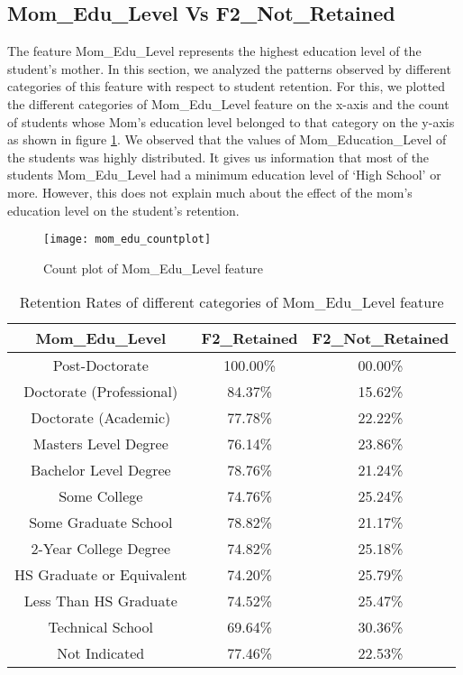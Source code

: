 \documentclass[11pt,openright]{report}
\begin{document}
\subsection {Mom\_Edu\_Level	 Vs F2\_Not\_Retained}
The feature Mom\_Edu\_Level represents the highest education level of the student's mother. In this section, we analyzed the patterns observed by different categories of this feature with respect to student retention. For this, we plotted the different categories of Mom\_Edu\_Level feature on the x-axis and the count of students whose Mom's education level belonged to that category on the y-axis as shown in figure \ref{fig:mom_edu_F2NotRetained_plot}. We observed that the values of Mom\_Education\_Level of the students was highly distributed. It gives us information that most of the students Mom\_Edu\_Level had a minimum education level of `High School' or more. However, this does not explain much about the effect of the mom's education level on the student's retention.

\begin{figure}[!ht]
	\centering
	\texttt{[image: mom\_edu\_countplot]}
	\caption{Count plot of Mom\_Edu\_Level feature}
	\label{fig:mom_edu_F2NotRetained_plot}
\end{figure}

\begin{table}[!t]
	\renewcommand{\arraystretch}{1.3}
	\caption{Retention Rates of different categories of Mom\_Edu\_Level feature}
	\label{table:mom_edu_retentions}
	\centering
	\begin{tabular}{|c|c|c|}
		\hline
		\bfseries Mom\_Edu\_Level & \bfseries F2\_Retained & \bfseries F2\_Not\_Retained\\
		\hline
		Post-Doctorate  & 100.00\%  & 00.00\% \\ \hline
		Doctorate (Professional) & 84.37\% &  15.62\% \\ \hline
		Doctorate (Academic) & 77.78\% & 22.22\% \\ \hline
		Masters Level Degree    &   76.14\% &  23.86\% \\ \hline
		Bachelor Level Degree &  78.76\%  & 21.24\% \\ \hline
		Some College & 74.76\% & 25.24\% \\ \hline
		Some Graduate School  & 78.82\% &  21.17\% \\ \hline
		2-Year College Degree    &  74.82\%  & 25.18\% \\ \hline
		HS Graduate or Equivalent  & 74.20\% &  25.79\% \\ \hline
		Less Than HS Graduate     & 74.52\% &  25.47\% \\ \hline
		Technical School  &         69.64\% &  30.36\% \\ \hline
		Not Indicated         &    77.46\% & 22.53\% \\ \hline
	\end{tabular}
\end{table}
\end{document}
